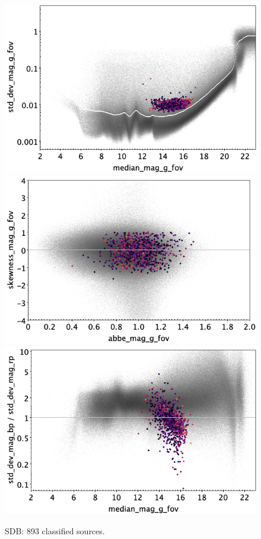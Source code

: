 \documentclass[longauth]{aa}
\begin{document}
\begin{appendix}
\begin{figure}
\hspace{2mm}
 \includegraphics[width=0.45\hsize]{figures/appendix/SDB_cls_msd.png} \\ %
\vspace{4mm}
 \includegraphics[width=0.45\hsize]{figures/appendix/SDB_cls_ask.png}  %
\hspace{2mm}
 \includegraphics[width=0.45\hsize]{figures/appendix/SDB_cls_msdr.png}  \\ %
\vspace{4mm}
 \caption{SDB: 893 classified sources.}  
 \label{fig:app:SDB}
\end{figure}


\end{appendix}
\end{document}
